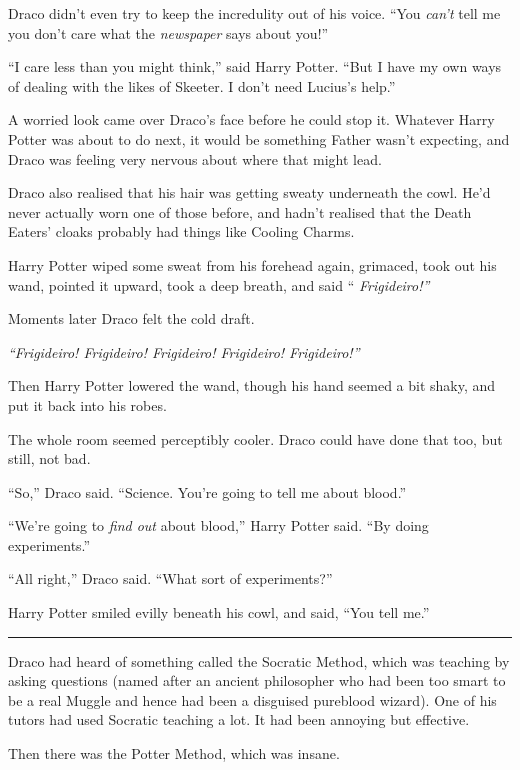 Draco didn't even try to keep the incredulity out of his voice. ``You
\emph{can't} tell me you don't care what the \emph{newspaper} says about
you!''

``I care less than you might think,'' said Harry Potter. ``But I have my
own ways of dealing with the likes of Skeeter. I don't need Lucius's
help.''

A worried look came over Draco's face before he could stop it. Whatever
Harry Potter was about to do next, it would be something Father wasn't
expecting, and Draco was feeling very nervous about where that might
lead.

Draco also realised that his hair was getting sweaty underneath the
cowl. He'd never actually worn one of those before, and hadn't realised
that the Death Eaters' cloaks probably had things like Cooling Charms.

Harry Potter wiped some sweat from his forehead again, grimaced, took
out his wand, pointed it upward, took a deep breath, and said ``
\emph{Frigideiro!''}

Moments later Draco felt the cold draft.

\emph{``Frigideiro! Frigideiro! Frigideiro! Frigideiro! Frigideiro!''}

Then Harry Potter lowered the wand, though his hand seemed a bit shaky,
and put it back into his robes.

The whole room seemed perceptibly cooler. Draco could have done that
too, but still, not bad.

``So,'' Draco said. ``Science. You're going to tell me about blood.''

``We're going to \emph{find out} about blood,'' Harry Potter said. ``By
doing experiments.''

``All right,'' Draco said. ``What sort of experiments?''

Harry Potter smiled evilly beneath his cowl, and said, ``You tell me.''

\begin{center}\rule{3in}{0.4pt}\end{center}

Draco had heard of something called the Socratic Method, which was
teaching by asking questions (named after an ancient philosopher who had
been too smart to be a real Muggle and hence had been a disguised
pureblood wizard). One of his tutors had used Socratic teaching a lot.
It had been annoying but effective.

Then there was the Potter Method, which was insane.


